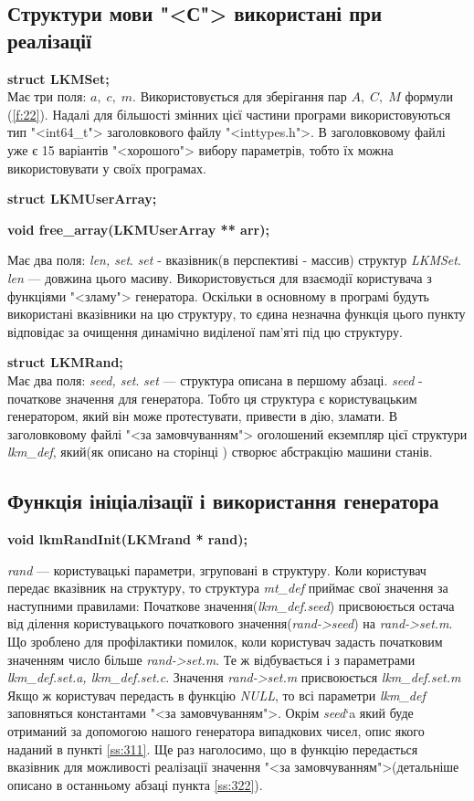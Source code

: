 \documentclass[oneside,final,14pt]{extreport}
\begin{document}
\begin{large}
\subsection{Структури мови "<С"> використані при реалізації}\label{ss:331}
 {\bfseries struct LKMSet;}\\
Має три поля: $a,\; c,\; m$. Використовується для зберігання пар ${A, \;C,\; M}$ формули (\ref{f:22}). Надалі для 
більшості змінних цієї частини програми використовуються тип "<int64\_t"> заголовкового файлу 
"<inttypes.h">. В заголовковому файлі уже є 15 варіантів "<хорошого"> вибору параметрів, тобто 
їх можна використовувати у своїх програмах.

{\bfseries struct LKMUserArray;}

{\bfseries void free\_array(LKMUserArray ** arr);}

	Має два поля: {\itshape len, set}. {\itshape set} - вказівник(в перспективі - массив) структур {\itshape LKMSet}. 
	{\itshape len} ---
	довжина цього масиву. Використовується для взаємодії користувача з функціями "<зламу"> 
	генератора. Оскільки в основному в програмі будуть використані вказівники на цю структуру, 
	то єдина незначна функція цього пункту відповідає за очищення динамічно виділеної пам'яті під цю структуру.

{\bfseries struct LKMRand;}\\
	Має два поля: {\itshape seed, set}. {\itshape set} --- структура описана в першому абзаці. 
	{\itshape seed} - початкове значення для генератора. Тобто ця структура є користувацьким 
	генератором, який він може протестувати, привести в дію, зламати. В заголовковому 
	файлі "<за замовчуванням"> оголошений екземпляр цієї структури {\itshape lkm\_def}, який(як описано 
	на сторінці \pageref{ss:321}) створює абстракцію машини станів.
\subsection{Функція ініціалізації і використання генератора}\label{ss:332}
{\bfseries void lkmRandInit(LKMrand * rand);}

	{\itshape rand} --- користувацькі параметри, згруповані в структуру. Коли користувач передає 
	вказівник на структуру, то структура {\itshape mt\_def} приймає свої значення за наступними правилами:
Початкове значення({\itshape lkm\_def.seed}) присвоюється остача від ділення користувацького 
початкового значення({\itshape rand->seed}) на {\itshape rand->set.m}. Що зроблено для профілактики помилок, 
коли користувач задасть початковим значенням число більше {\itshape rand->set.m}.
Те ж відбувається і з параметрами {\itshape lkm\_def.set.a, lkm\_def.set.c}.
Значення {\itshape rand->set.m} присвоюється {\itshape lkm\_def.set.m}
	Якщо ж користувач передасть в функцію {\itshape NULL}, то всі параметри {\itshape lkm\_def} заповняться 
	константами "<за замовчуванням">. Окрім {\itshape seed}`a який буде отриманий за допомогою нашого 
	генератора випадкових чисел, опис якого наданий в пункті \ref{ss:311}. Ще раз наголосимо, що 
	в функцію передається вказівник для можливості реалізації значення 
	"<за замовчуванням">(детальніше описано в останньому абзаці пункта \ref{ss:322}).


\end{large}
\end{document}

